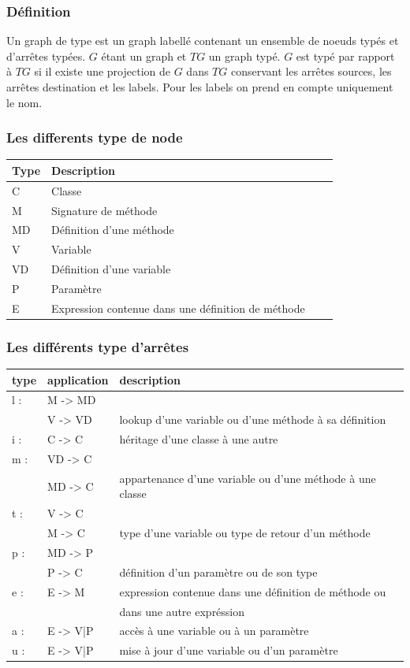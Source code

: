 \documentclass[a4paper, 12pt]{article}
\begin{document}
\subsubsection{Définition}
Un graph de type est un graph labellé contenant un ensemble de noeuds typés et d'arrêtes typées. \(G\) étant un graph et \(TG\) un graph typé. \(G\) est typé par rapport à \(TG\) si il existe une projection
de \(G\) dans \(TG\) conservant les arrêtes sources, les arrêtes destination et les labels. Pour les labels on prend en compte uniquement le nom.

\subsubsection{Les differents type de node}

  \begin{tabular}{ | l | l | l | p{5cm} |}
    \hline
    Type & Description  \\ \hline
    C & Classe   \\ \hline
    M & Signature de méthode   \\ \hline
    MD &  Définition d'une méthode   \\ \hline
    V &  Variable   \\ \hline
    VD &  Définition d'une variable \\ \hline
    P & Paramètre \\ \hline
    E &  Expression contenue dans une définition de méthode \\ \hline
    \end{tabular}

\subsubsection{Les différents type d'arrêtes}
  \begin{tabular}{ | l | l |  l |}
    \hline type & application & description  \\ \hline
    l : & M -> MD & \\ & V -> VD & lookup d'une variable ou d'une méthode à sa définition \\ \hline 
    i : & C -> C &  héritage d'une classe à une autre  \\ \hline
    m : & VD -> C & \\ & MD -> C & appartenance d'une variable ou d'une méthode à une classe  \\ \hline
    t : & V -> C  & \\ &  M -> C & type d'une variable ou type de retour d'un méthode   \\ \hline
    p : & MD -> P  & \\ &  P -> C & définition d'un paramètre ou de son type     \\ \hline
    e : & E -> M & expression contenue dans une définition de méthode ou \\ & &  dans une autre expréssion    \\ \hline
    a : & E -> {V|P} & accès à une variable ou à un paramètre    \\ \hline
    u : & E -> {V|P} & mise à jour d'une variable ou d'un paramètre    \\ \hline
   \end{tabular}
\end{document}
